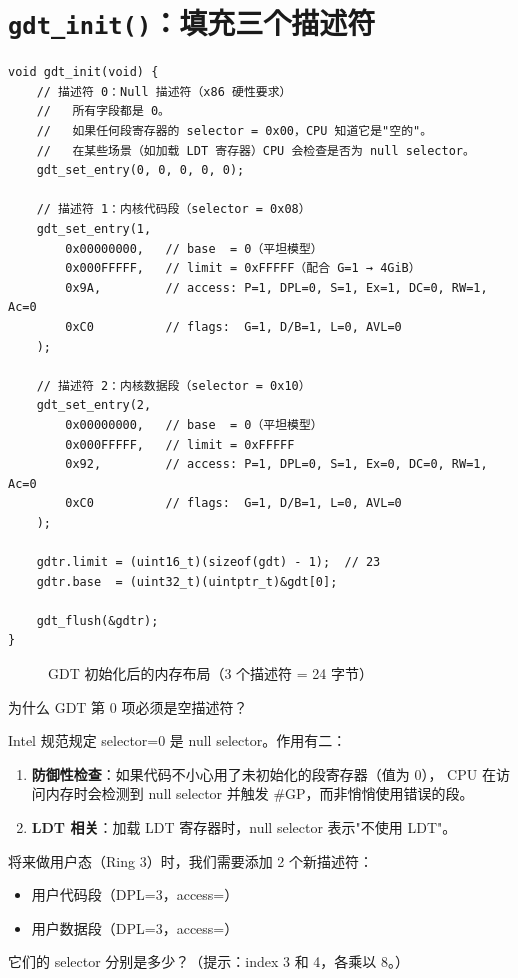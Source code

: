 \section{\texttt{gdt\_init()}：填充三个描述符}

\begin{lstlisting}[style=cstyle]
void gdt_init(void) {
    // 描述符 0：Null 描述符（x86 硬性要求）
    //   所有字段都是 0。
    //   如果任何段寄存器的 selector = 0x00，CPU 知道它是"空的"。
    //   在某些场景（如加载 LDT 寄存器）CPU 会检查是否为 null selector。
    gdt_set_entry(0, 0, 0, 0, 0);

    // 描述符 1：内核代码段（selector = 0x08）
    gdt_set_entry(1,
        0x00000000,   // base  = 0（平坦模型）
        0x000FFFFF,   // limit = 0xFFFFF（配合 G=1 → 4GiB）
        0x9A,         // access: P=1, DPL=0, S=1, Ex=1, DC=0, RW=1, Ac=0
        0xC0          // flags:  G=1, D/B=1, L=0, AVL=0
    );

    // 描述符 2：内核数据段（selector = 0x10）
    gdt_set_entry(2,
        0x00000000,   // base  = 0（平坦模型）
        0x000FFFFF,   // limit = 0xFFFFF
        0x92,         // access: P=1, DPL=0, S=1, Ex=0, DC=0, RW=1, Ac=0
        0xC0          // flags:  G=1, D/B=1, L=0, AVL=0
    );

    gdtr.limit = (uint16_t)(sizeof(gdt) - 1);  // 23
    gdtr.base  = (uint32_t)(uintptr_t)&gdt[0];

    gdt_flush(&gdtr);
}
\end{lstlisting}

\begin{figure}[H]
  \centering
  
  \caption{GDT 初始化后的内存布局（3 个描述符 = 24 字节）}
\end{figure}

\begin{designbox}
为什么 GDT 第 0 项必须是空描述符？

Intel 规范规定 selector=0 是 null selector。作用有二：
\begin{enumerate}
  \item \textbf{防御性检查}：如果代码不小心用了未初始化的段寄存器（值为 0），
    CPU 在访问内存时会检测到 null selector 并触发 \#GP，而非悄悄使用错误的段。
  \item \textbf{LDT 相关}：加载 LDT 寄存器时，null selector 表示"不使用 LDT"。
\end{enumerate}
\end{designbox}

\begin{thinkbox}
将来做用户态（Ring 3）时，我们需要添加 2 个新描述符：
\begin{itemize}
  \item 用户代码段（DPL=3，access=）
  \item 用户数据段（DPL=3，access=）
\end{itemize}
它们的 selector 分别是多少？（提示：index 3 和 4，各乘以 8。）
\end{thinkbox}


